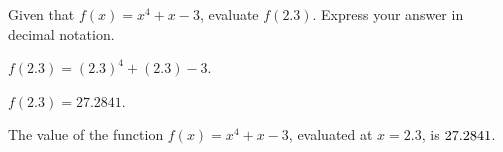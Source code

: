 \begin{shuffle}
\begin{exercise}
Given that $f(x)=x^4+x-3$, evaluate $f(2.3)$. Express your answer in decimal notation.
\begin{solution}
\begin{hint}
$f(2.3)=(2.3)^4+(2.3)-3$.
\end{hint}
\begin{hint}
$f(2.3)=27.2841$.
\end{hint}
The value of the function $f(x) = x^4+x-3$, evaluated at $x=2.3$, is ${27.2841}$.
\end{solution}
\end{exercise}
\end{shuffle}




